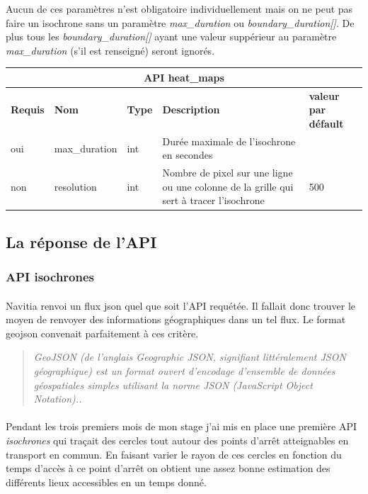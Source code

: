 \documentclass[a4paper]{report}
\begin{document}
Aucun de ces paramètres n'est obligatoire individuellement mais on ne peut pas faire un isochrone sans un paramètre \emph{max\_duration} ou \emph{boundary\_duration[]}. De plus tous les \emph{boundary\_duration[]} ayant une valeur suppérieur au paramètre \emph{max\_duration} (s'il est renseigné) seront ignorés. 

\begin{center}
	\begin{tabular}{|l|l|p{1.5cm}|p{6cm}|l|}
	\hline
	\multicolumn{5}{|c|}{\cellcolor{LightCyan} \textbf{API heat\_maps}} \\
	\hline
	\textbf{Requis} & \textbf{Nom} & \textbf{Type} & \textbf{Description} &  \textbf{valeur par défault} \\
	\hline
	oui & max\_duration & int & Durée maximale de l'isochrone en secondes &\\
	\hline
	non & resolution & int & Nombre de pixel sur une ligne ou une colonne de la grille qui sert à tracer l'isochrone & 500\\
	\hline
	\end{tabular}
\end{center}

\subsection{La réponse de l'API}

\subsubsection{API isochrones} 

\paragraph{}Navitia renvoi un flux json quel que soit l'API requétée. Il fallait donc trouver le moyen de renvoyer des informations géographiques dans un tel flux. Le format geojson convenait parfaitement à ces critère.

\begin{quote}
	\emph{GeoJSON (de l'anglais Geographic JSON, signifiant littéralement JSON géographique) est un format ouvert d'encodage d'ensemble de données géospatiales simples utilisant la norme JSON (JavaScript Object Notation).\cite{ref}.}
\end{quote}


\paragraph{} Pendant les trois premiers mois de mon stage j'ai mis en place une première API \emph{isochrones} qui traçait des cercles tout autour des points d'arrêt atteignables en transport en commun. En faisant varier le rayon de ces cercles en fonction du temps d'accès à ce point d'arrêt on obtient une assez bonne estimation des différents lieux accessibles en un temps donné.
\end{document}
